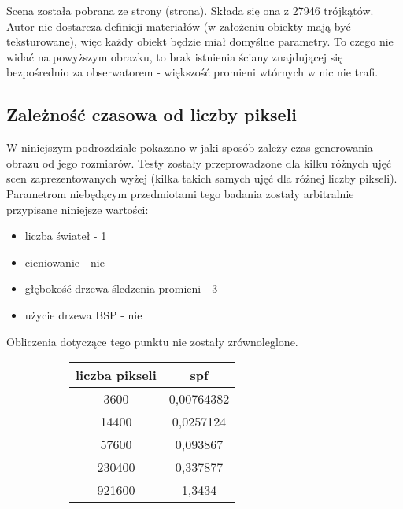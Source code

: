 Scena została pobrana ze strony (strona). Składa się ona z 27946 trójkątów. Autor nie dostarcza definicji materiałów (w założeniu obiekty mają być teksturowane), więc każdy obiekt będzie miał domyślne parametry. To czego nie widać na powyższym obrazku, to brak istnienia ściany znajdującej się bezpośrednio za obserwatorem - większość promieni wtórnych w nic nie trafi.


\subsection{Zależność czasowa od liczby pikseli}

W niniejszym podrozdziale pokazano w jaki sposób zależy czas generowania obrazu od jego rozmiarów. Testy zostały przeprowadzone dla kilku różnych ujęć scen zaprezentowanych wyżej (kilka takich samych ujęć dla różnej liczby pikseli). Parametrom niebędącym przedmiotami tego badania zostały arbitralnie przypisane niniejsze wartości:

\begin{itemize}

\item liczba świateł - 1
\item cieniowanie - nie
\item głębokość drzewa śledzenia promieni - 3
\item użycie drzewa BSP - nie

\end{itemize}

Obliczenia dotyczące tego punktu nie zostały zrównoleglone.

\begin{figure}[!htb]
\advance\leftskip-2cm
\begin{subfigure}{.5\textwidth}
\end{subfigure}
\hspace{2cm}
\begin{subfigure}{.5\textwidth}
		\begin{longtable}{|c|c|} \hline
	    liczba pikseli & spf \\ \hline
	    3600 & 0,00764382 \\ 
	    14400 & 0,0257124 \\
		57600 & 0,093867 \\
		230400 & 0,337877 \\
		921600 & 1,3434 \\
		\hline
		\end{longtable}
\end{subfigure}
\end{figure}

